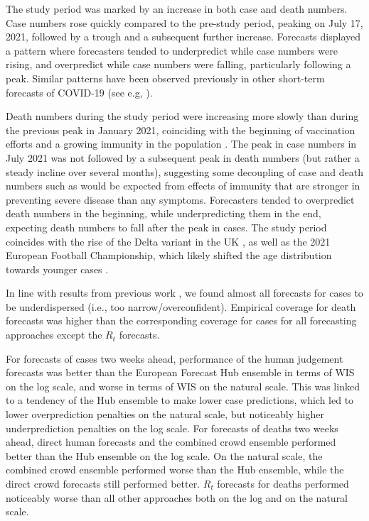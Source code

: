\documentclass[10pt,a4paper,twocolumn]{article}
\begin{document}
The study period was marked by an increase in both case and death numbers. Case numbers rose quickly compared to the pre-study period, peaking on July 17, 2021, followed by a trough and a subsequent further increase. Forecasts displayed a pattern where forecasters tended to underpredict while case numbers were rising, and overpredict while case numbers were falling, particularly following a peak. Similar patterns have been observed previously in other short-term forecasts of COVID-19 (see e.g, \citep{sherrattPredictivePerformanceMultimodel2022, bracherShorttermForecastingCOVID192021, bosseComparingHumanModelbased2022}).

Death numbers during the study period were increasing more slowly than during the previous peak in January 2021, coinciding with the beginning of vaccination efforts and a growing immunity in the population \citep{perez-guzmanEpidemiologicalDriversTransmissibility2023}. The peak in case numbers in July 2021 was not followed by a subsequent peak in death numbers (but rather a steady incline over several months), suggesting some decoupling of case and death numbers such as would be expected from effects of immunity that are stronger in preventing severe disease than any symptoms. Forecasters tended to overpredict death numbers in the beginning, while underpredicting them in the end, expecting death numbers to fall after the peak in cases. The study period coincides with the rise of the Delta variant in the UK \citep{bastIncreasedRiskHospitalisation2021, perez-guzmanEpidemiologicalDriversTransmissibility2023}, as well as the 2021 European Football Championship, which likely shifted the age distribution towards younger cases \citep{dehningImpactEuro20202023}.

In line with results from previous work \citep{bosseComparingHumanModelbased2022, sherrattPredictivePerformanceMultimodel2022}, we found almost all forecasts for cases to be underdispersed (i.e., too narrow/overconfident). Empirical coverage for death forecasts was higher than the corresponding coverage for cases for all forecasting approaches except the $R_t$ forecasts. 

For forecasts of cases two weeks ahead, performance of the human judgement forecasts was better than the European Forecast Hub ensemble in terms of WIS on the log scale, and worse in terms of WIS on the natural scale. This was linked to a tendency of the Hub ensemble to make lower case predictions, which led to lower overprediction penalties on the natural scale, but noticeably higher underprediction penalties on the log scale. 
For forecasts of deaths two weeks ahead, direct human forecasts and the combined crowd ensemble performed better than the Hub ensemble on the log scale. On the natural scale, the combined crowd ensemble performed worse than the Hub ensemble, while the direct crowd forecasts still performed better. $R_t$ forecasts for deaths performed noticeably worse than all other approaches both on the log and on the natural scale. 
\end{document}
